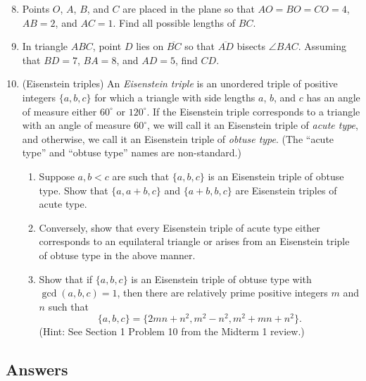 \begin{enumerate}\setcounter{enumi}{7}
\item Points $O$, $A$, $B$, and $C$ are placed in the plane so that $AO = BO = CO = 4$, $AB = 2$, and $AC = 1$. Find all possible lengths of $BC$.
\item In triangle $ABC$, point $D$ lies on $\overline{BC}$ so that $\overline{AD}$ bisects $\angle BAC$. Assuming that $BD = 7$, $BA = 8$, and $AD = 5$, find $CD$.
\item (Eisenstein triples) An \emph{Eisenstein triple} is an unordered triple of positive integers $\{a,b,c\}$ for which a triangle with side lengths $a$, $b$, and $c$ has an angle of measure either $60^{\circ}$ or $120^{\circ}$. If the Eisenstein triple corresponds to a triangle with an angle of measure $60^{\circ}$, we will call it an Eisenstein triple of \emph{acute type}, and otherwise, we call it an Eisenstein triple of \emph{obtuse type}. (The ``acute type'' and ``obtuse type'' names are non-standard.)
\begin{enumerate}
\item Suppose $a, b < c$ are such that $\{a,b,c\}$ is an Eisenstein triple of obtuse type. Show that $\{a, a + b, c\}$ and $\{a + b, b, c\}$ are Eisenstein triples of acute type.
\item Conversely, show that every Eisenstein triple of acute type either corresponds to an equilateral triangle or arises from an Eisenstein triple of obtuse type in the above manner.
\item Show that if $\{a,b,c\}$ is an Eisenstein triple of obtuse type with $\gcd(a,b,c) = 1$, then there are relatively prime positive integers $m$ and $n$ such that
\begin{equation*}
\{a,b,c\} = \{2mn + n^2, m^2 - n^2, m^2 + mn + n^2\}.
\end{equation*}
(Hint: See Section 1 Problem 10 from the Midterm 1 review.)
\end{enumerate}
\end{enumerate}


\newpage
\subsection{Answers}

